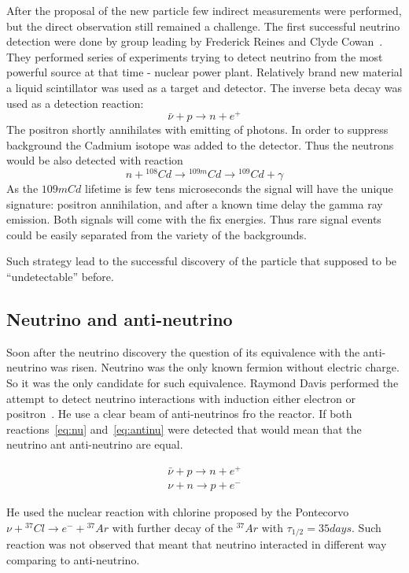 \documentclass[../main.tex]{subfiles}
\begin{document}
After the proposal of the new particle few indirect measurements were performed, but the direct observation still remained a challenge. The first successful neutrino detection were done by group leading by Frederick Reines and Clyde Cowan~\cite{Cowan1956}. They performed series of experiments trying to detect neutrino from the most powerful source at that time - nuclear power plant. Relatively brand new material a liquid scintillator was used as a target and detector. The inverse beta decay was used as a detection reaction:
\begin{equation}
\bar{\nu}+p\to n+e^+
\end{equation}
The positron shortly annihilates with emitting of photons. In order to suppress background the Cadmium isotope was added to the detector. Thus the neutrons would be also detected with reaction
\begin{equation}
n+{}^{108}Cd\to{}^{109m}Cd\to{}^{109}Cd+\gamma
\end{equation}
As the ${109m}Cd$ lifetime is few tens microseconds the signal will have the unique signature: positron annihilation, and after a known time delay the gamma ray emission. Both signals will come with the fix energies. Thus rare signal events could be easily separated from the variety of the backgrounds.

Such strategy lead to the successful discovery of the particle that supposed to be ``undetectable'' before.

\subsection{Neutrino and anti-neutrino}
\label{sec:anti}
Soon after the neutrino discovery the question of its equivalence with the anti-neutrino was risen. Neutrino was the only known fermion without electric charge. So it was the only candidate for such equivalence. Raymond Davis performed the attempt to detect neutrino interactions with induction either electron or positron~\cite{Davis1955}. He use a clear beam of anti-neutrinos fro the reactor. If both reactions~\autoref{eq:nu} and~\autoref{eq:antinu} were detected that would mean that the neutrino ant anti-neutrino are equal.

\begin{eqnarray}
\label{eq:nu}
\bar{\nu}+p\rightarrow n+e^+ \\
\nu+n\rightarrow p+e^-
\label{eq:antinu}
\end{eqnarray}

He used the nuclear reaction with chlorine proposed by the Pontecorvo $\nu+{}^{37}Cl\to e^-+{}^{37}Ar$ with further decay of the ${}^{37}Ar$ with $\tau_{1/2}=35 days$. Such reaction was not observed that meant that neutrino interacted in different way comparing to anti-neutrino.
\end{document}
